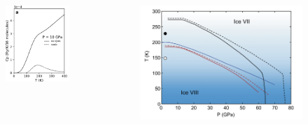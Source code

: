 \documentclass[13pt,aspectratio=169]{beamer}
\begin{document}
\begin{frame}{\subsecname}
	\begin{columns}
		\begin{column}{0.45\textwidth}
			\begin{figure}
				\includegraphics[width=\columnwidth]{images/cp}%
			\end{figure}
		\end{column}

		\begin{column}{0.45\textwidth}
			\begin{figure}
				\includegraphics[width=\columnwidth]{images/boundary}%
			\end{figure}
		\end{column}
	\end{columns}
\end{frame}
\end{document}
